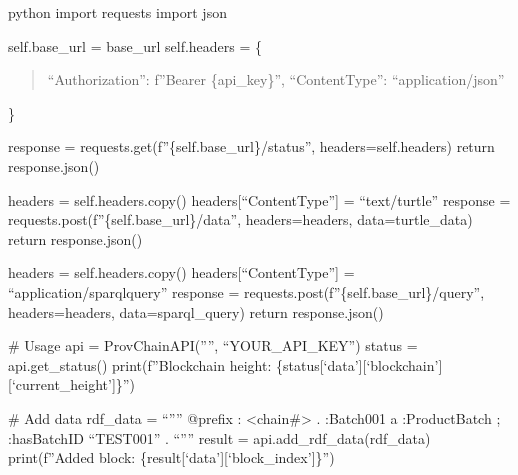 \documentclass[letterpaper,10pt,english]{sphinxmanual}
\begin{document}
\sphinxAtStartPar
{\color{red}\bfseries{}\textasciigrave{}\textasciigrave{}}{\color{red}\bfseries{}\textasciigrave{}}



\sphinxAtStartPar
{\color{red}\bfseries{}\textasciigrave{}\textasciigrave{}}{\color{red}\bfseries{}\textasciigrave{}}python
import requests
import json
\begin{description}
\begin{description}
\sphinxAtStartPar
self.base\_url = base\_url
self.headers = \{
\begin{quote}

\sphinxAtStartPar
“Authorization”: f”Bearer \{api\_key\}”,
“Content\sphinxhyphen{}Type”: “application/json”
\end{quote}

\sphinxAtStartPar
\}

\sphinxAtStartPar
response = requests.get(f”\{self.base\_url\}/status”, headers=self.headers)
return response.json()

\sphinxAtStartPar
headers = self.headers.copy()
headers{[}“Content\sphinxhyphen{}Type”{]} = “text/turtle”
response = requests.post(f”\{self.base\_url\}/data”, headers=headers, data=turtle\_data)
return response.json()

\sphinxAtStartPar
headers = self.headers.copy()
headers{[}“Content\sphinxhyphen{}Type”{]} = “application/sparql\sphinxhyphen{}query”
response = requests.post(f”\{self.base\_url\}/query”, headers=headers, data=sparql\_query)
return response.json()

\end{description}

\end{description}

\sphinxAtStartPar
\# Usage
api = ProvChainAPI(””, “YOUR\_API\_KEY”)
status = api.get\_status()
print(f”Blockchain height: \{status{[}‘data’{]}{[}‘blockchain’{]}{[}‘current\_height’{]}\}”)

\sphinxAtStartPar
\# Add data
rdf\_data = “””
@prefix : \textless{}\sphinxhyphen{}chain\#\textgreater{} .
:Batch001 a :ProductBatch ; :hasBatchID “TEST\sphinxhyphen{}001” .
“””
result = api.add\_rdf\_data(rdf\_data)
print(f”Added block: \{result{[}‘data’{]}{[}‘block\_index’{]}\}”)
{\color{red}\bfseries{}\textasciigrave{}\textasciigrave{}}{\color{red}\bfseries{}\textasciigrave{}}
\end{document}
